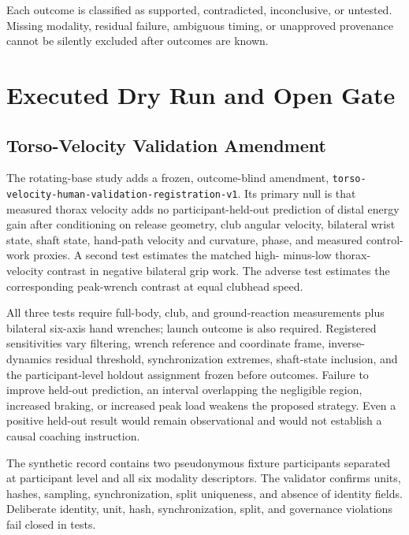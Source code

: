\documentclass[
  letterpaper,
]{report}
\begin{document}
Each outcome is classified as supported, contradicted, inconclusive, or
untested. Missing modality, residual failure, ambiguous timing, or
unapproved provenance cannot be silently excluded after outcomes are
known.

\section{Executed Dry Run and Open
Gate}\label{executed-dry-run-and-open-gate}

\subsection{Torso-Velocity Validation
Amendment}\label{torso-velocity-validation-amendment}

The rotating-base study adds a frozen, outcome-blind amendment,
\texttt{torso-velocity-human-validation-registration-v1}. Its primary
null is that measured thorax velocity adds no participant-held-out
prediction of distal energy gain after conditioning on release geometry,
club angular velocity, bilateral wrist state, shaft state, hand-path
velocity and curvature, phase, and measured control-work proxies. A
second test estimates the matched high- minus-low thorax-velocity
contrast in negative bilateral grip work. The adverse test estimates the
corresponding peak-wrench contrast at equal clubhead speed.

All three tests require full-body, club, and ground-reaction
measurements plus bilateral six-axis hand wrenches; launch outcome is
also required. Registered sensitivities vary filtering, wrench reference
and coordinate frame, inverse- dynamics residual threshold,
synchronization extremes, shaft-state inclusion, and the
participant-level holdout assignment frozen before outcomes. Failure to
improve held-out prediction, an interval overlapping the negligible
region, increased braking, or increased peak load weakens the proposed
strategy. Even a positive held-out result would remain observational and
would not establish a causal coaching instruction.

The synthetic record contains two pseudonymous fixture participants
separated at participant level and all six modality descriptors. The
validator confirms units, hashes, sampling, synchronization, split
uniqueness, and absence of identity fields. Deliberate identity, unit,
hash, synchronization, split, and governance violations fail closed in
tests.
\end{document}
